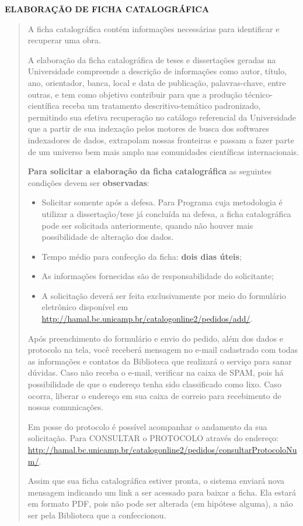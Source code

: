 
\newpage
\begin{center}
  {\Large\textbf{ELABORAÇÃO DE FICHA CATALOGRÁFICA}}
\end{center}

\begin{quotation}
  A ficha catalográfica contém informações necessárias para identificar e
  recuperar uma obra.

  A elaboração da ficha catalográfica de teses e dissertações geradas na
  Universidade compreende a descrição de informações como autor, título, ano,
  orientador, banca, local e data de publicação, palavras-chave, entre outras, e
  tem como objetivo contribuir para que a produção técnico-científica receba um
  tratamento descritivo-temático padronizado, permitindo sua efetiva recuperação
  no catálogo referencial da Universidade que a partir de sua indexação pelos
  motores de busca dos softwares indexadores de dados, extrapolam nossas
  fronteiras e passam a fazer parte de um universo bem mais amplo nas
  comunidades científicas internacionais.

  \textbf{Para solicitar a elaboração da ficha catalográfica} as seguintes condições
  devem ser \textbf{observadas}:

  \begin{itemize}
    \item Solicitar somente após a defesa. Para Programa cuja metodologia é
      utilizar a dissertação/tese já concluída na defesa, a ficha catalográfica
      pode ser solicitada anteriormente, quando não houver mais possibilidade de
      alteração dos dados.
    \item Tempo médio para confecção da ficha: \textbf{dois dias úteis};
    \item As informações fornecidas são de responsabilidade do solicitante;
    \item A solicitação deverá ser feita exclusivamente por meio do formulário
      eletrônico disponível em
      \url{http://hamal.bc.unicamp.br/catalogonline2/pedidos/add/}.
  \end{itemize}

    Após preenchimento do formulário e envio do pedido, além dos dados e
    protocolo na tela, você receberá mensagem no e-mail cadastrado com todas as
    informações e contatos da Biblioteca que realizará o serviço para sanar
    dúvidas. Caso não receba o e-mail, verificar na caixa de SPAM, pois há
    possibilidade de que o endereço tenha sido classificado como lixo. Caso
    ocorra, liberar o endereço em sua caixa de correio para recebimento de
    nossas comunicações.

    Em posse do protocolo é possível acompanhar o andamento da sua solicitação.
    Para CONSULTAR o PROTOCOLO através do endereço:
    \url{http://hamal.bc.unicamp.br/catalogonline2/pedidos/consultarProtocoloNum/}.

    Assim que sua ficha catalográfica estiver pronta, o sistema enviará
    nova mensagem indicando um link a ser acessado para baixar a ficha. Ela
    estará em formato PDF, pois não pode ser alterada (em hipótese alguma), a
    não ser pela Biblioteca que a confeccionou.
\end{quotation}

